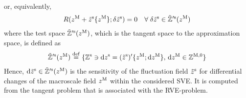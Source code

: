 \documentclass[12pt,a4paper]{article}
\renewcommand{\Box}{\mdlgwhtsquare}
\newcommand{\rve}{
  {\mathchoice
   {\mbox{\scalebox{0.67}{$\Box$}}}
   {\mbox{\scalebox{0.67}{$\Box$}}}
   {\mbox{\scalebox{0.5}{$\Box$}}}
   {\mbox{\scalebox{0.375}{$\Box$}}}
  }
}
\begin{document}
or, equivalently, 
\begin{align}
\label{eq:A6b} R(z^{\mathrm{M}} + \tilde z^{\mathrm{s}}\{z^{\mathrm{M}}\}; \delta\tilde{z}^{\mathrm{s}}) = 0\quad \forall\;\delta \tilde{z}^{\mathrm{s}}\in\tilde{\mathbb{Z}}'^{\mathrm{s}}(z^{\mathrm{M}})
\end{align}
where the test space $\tilde{\mathbb{Z}}'^{\mathrm{s}}(z^{\mathrm{M}})$, which is the tangent space to the approximation space, is defined as
\begin{align}
    \tilde{\mathbb{Z}}'^{\mathrm{s}}(z^{\mathrm{M}})\overset{\mathrm{def}}{=}\{\mathbb{Z}^{\mathrm{s}}\ni \operatorname{d \!} z^{\mathrm{s}} = (\tilde{z}^{\mathrm{s}})'\{z^{\mathrm{M}};\operatorname{d \!} z^{\mathrm{M}}\},\,
    \operatorname{d \!} z^{\mathrm{M}}\in \mathbb{Z}^{\mathrm{M},0}\}
\label{eq:A6c}
\end{align}
Hence, $\operatorname{d \!} \tilde{z}^{\mathrm{s}}\in\tilde{\mathbb{Z}}'^{\mathrm{s}}(z^{\mathrm{M}})$ is the sensitivity of the fluctuation field $\tilde{z}^{\mathrm{s}}$ for differential changes of the macroscale field $z^{\mathrm{M}}$ within the considered SVE.
It is computed from the tangent problem that is associated with the RVE-problem.
\end{document}
